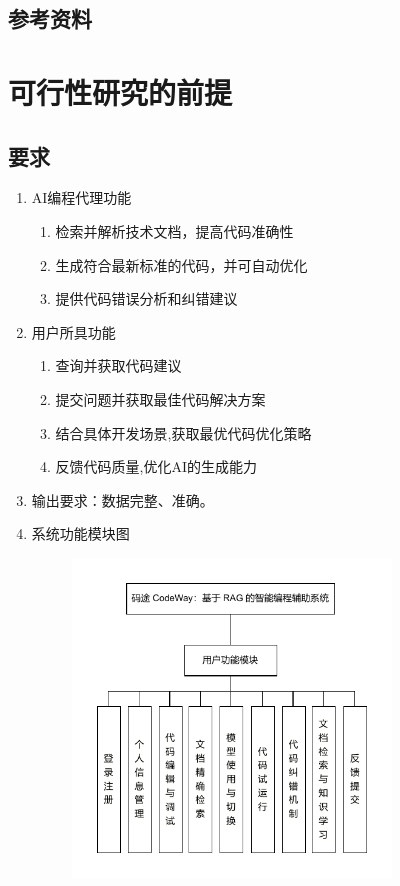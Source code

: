 \documentclass[
    report,     %
    oneside,    %
    UTF8,       %
    zihao=-4    %
]{config} %
\begin{document}
\subsection{参考资料}


\section{可行性研究的前提}
\subsection{要求}
\begin{enumerate}[label=(\arabic*)]
    \item AI编程代理功能
    \begin{enumerate}[label=(\alph*)]
        \item 检索并解析技术文档，提高代码准确性
        \item 生成符合最新标准的代码，并可自动优化
        \item 提供代码错误分析和纠错建议
    \end{enumerate}
    \item 用户所具功能
    \begin{enumerate}[label=(\alph*)]
        \item 查询并获取代码建议
        \item 提交问题并获取最佳代码解决方案
        \item 结合具体开发场景,获取最优代码优化策略
        \item 反馈代码质量,优化AI的生成能力
    \end{enumerate}
    \item 输出要求：数据完整、准确。
    \item 系统功能模块图
    \begin{figure}[h] %
        \centering %
        \includegraphics[width=0.8\textwidth]{figures/system-module.pdf}

\end{figure}
\end{enumerate}
\end{document}
